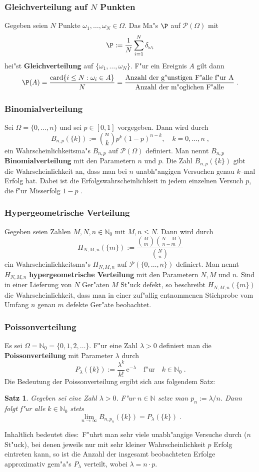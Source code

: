 \documentclass[ngerman,draft,parskip=half,twoside]{scrartcl}
\newtheorem{thm}{Satz}[section]
\newcommand*{\N}{\mathbb{N}}      %
\newcommand*{\PotM}{\mathcal{P}}    %
\begin{document}
\subsubsection{Gleichverteilung auf $N$ Punkten}
Gegeben seien $N$ Punkte $\omega_1,\ldots,\omega_N\in\Omega$.
Das Ma"s $\P$ auf $\PotM(\Omega)$ mit
$$
\P:=\frac{1}{N}\sum_{i=1}^N \delta_{\omega_i}
$$
hei"st \textbf{Gleichverteilung} auf $\{\omega_1,\ldots,\omega_N\}$. F"ur ein Ereignis $A$ gilt dann
$$
\P(A)=\frac{\mathrm{card}\{ i\le N : \omega_i\in A\}}{N}=
\frac{\mbox{Anzahl der g"unstigen F"alle f"ur A}}{\mbox{Anzahl der m"oglichen F"alle}}\;.
$$
\subsubsection{Binomialverteilung}
Sei $\Omega=\{0,\ldots,n\}$ und sei $p\in[0,1]$ vorgegeben. Dann wird durch
$$
B_{n,p}(\{k\}):={n\choose k} p^k(1-p)^{n-k},\quad k=0,\ldots,n\;,
$$
ein Wahrscheinlichkeitsma"s $B_{n,p}$ auf $\PotM(\Omega)$ definiert. Man nennt $B_{n,p}$
\textbf{Binomialverteilung} mit den Parametern $n$ und $p$. Die Zahl
$B_{n,p}(\{k\})$ gibt die Wahrscheinlichkeit an, dass man bei $n$ unabh"angigen Versuchen genau $k$--mal
Erfolg hat. Dabei ist die Erfolgswahrscheinlichkeit in jedem einzelnen Versuch $p$, die f"ur
Misserfolg $1-p$ .
\subsubsection{Hypergeometrische Verteilung}
Gegeben seien Zahlen $M,N,n\in\N_0$ mit $M,n\le N$. Dann wird durch
$$
H_{N, M ,n}(\{m\}) :=\frac{{M\choose m}{N-M\choose n-m}}{{N\choose n}}
$$
ein Wahrscheinlichkeitsma"s $H_{N,M,n}$ auf $\PotM(\{0,\ldots,n\})$
definiert. Man nennt $H_{N,M,n}$  \textbf{hypergeometrische Verteilung} mit den Parametern $N,M$ und $n$.
Sind in einer Lieferung von $N$ Ger"aten $M$ St"uck defekt, so beschreibt $H_{N,M,n}(\{m\})$
die Wahrscheinlichkeit, dass man in einer zuf"allig entnommenen Stichprobe vom Umfang $n$ genau
$m$ defekte Ger"ate beobachtet.
\subsubsection{Poissonverteilung}
Es sei $\Omega=\N_0=\{0,1,2,\ldots\}$. F"ur eine Zahl $\lambda>0$ definiert
man die \textbf{Poissonverteilung} mit Parameter $\lambda$ durch
$$
P_\lambda(\{k\}):= \frac{\lambda^k}{k !}\,\mathrm e^{-\lambda}\quad\mbox{f"ur}\quad k\in\N_0\;.
$$
Die Bedeutung der Poissonverteilung ergibt sich aus folgendem Satz$\colon$
\begin{thm}
Gegeben sei eine Zahl $\lambda>0$. F"ur $n\in\N$ setze man
$p_n:=\lambda/n$. Dann folgt f"ur alle $k\in\N_0$
stets
$$
\lim_{n\to\infty} B_{n,p_n}(\{k\})= P_\lambda(\{k\})\;.
$$
\end{thm}
Inhaltlich bedeutet dies$\colon$ F"uhrt man sehr viele unabh"angige Versuche durch ($n$ St"uck), bei denen jeweils
nur mit sehr kleiner
Wahrscheinlichkeit $p$ Erfolg eintreten kann, so ist die Anzahl der insgesamt beobachteten Erfolge
approximativ gem"a"s $P_\lambda$ verteilt, wobei $\lambda= n\cdot p$.
\end{document}
